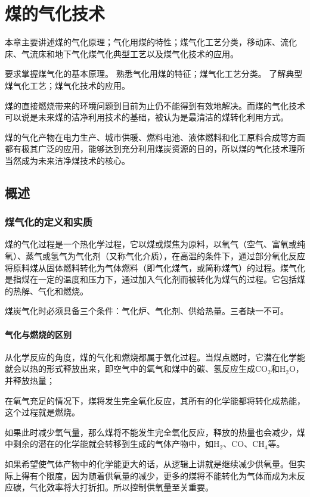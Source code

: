 \documentclass[10pt,openany]{ctexbook}
\begin{document}
\chapter{煤的气化技术}
本章主要讲述煤的气化原理；气化用煤的特性；煤气化工艺分类，移动床、流化床、气流床和地下气化煤气化典型工艺以及煤气化技术的应用。 \par
    要求掌握煤气化的基本原理。
    熟悉气化用煤的特征；煤气化工艺分类。
    了解典型煤气化工艺；煤气化技术的应用。\par
    煤的直接燃烧带来的环境问题到目前为止仍不能得到有效地解决。而煤的气化技术可以说是未来煤的洁净利用技术的基础，被认为是最清洁的煤转化利用方式。\par
      煤的气化产物在电力生产、城市供暖、燃料电池、液体燃料和化工原料合成等方面都有极其广泛的应用，能够达到充分利用煤炭资源的目的，所以煤的气化技术理所当然成为未来洁净煤技术的核心。
      \section{概述}
      \subsection{煤气化的定义和实质}
    煤的气化过程是一个热化学过程，它以煤或煤焦为原料，以氧气（空气、富氧或纯氧）、蒸气或氢气为气化剂（又称气化介质），在高温的条件下，通过部分氧化反应将原料煤从固体燃料转化为气体燃料（即气化煤气，或简称煤气）的过程。煤气化是指煤在一定的温度和压力下，通过加入气化剂而被转化为煤气的过程。它包括煤的热解、气化和燃烧。\par
    煤炭气化时必须具备三个条件：气化炉、气化剂、供给热量。三者缺一不可。
    \subsubsection{气化与燃烧的区别}
从化学反应的角度，煤的气化和燃烧都属于氧化过程。当煤点燃时，它潜在化学能就会以热的形式释放出来，即空气中的氧气和煤中的碳、氢反应生成CO$_2$和H$_2$O，并释放热量；\par
  在氧气充足的情况下，煤将发生完全氧化反应，其所有的化学能都将转化成热能，这个过程就是燃烧。\par
 如果此时减少氧气量，那么煤将不能发生完全氧化反应，释放的热量也会减少，煤中剩余的潜在的化学能就会转移到生成的气体产物中，如H$_2$、CO、CH$_4$等。\par
  如果希望使气体产物中的化学能更大的话，从逻辑上讲就是继续减少供氧量。但实际上得有个限度，因为随着供氧量的减少，更多的煤将不能转化为气体而成为未反应碳，气化效率将大打折扣。所以控制供氧量至关重要。
\end{document}
